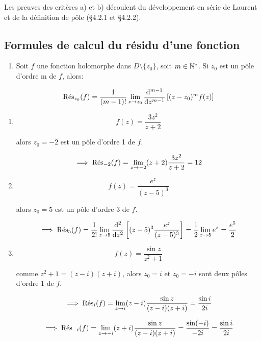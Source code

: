 \begin{remark}
    Les preuves des critères a) et b) découlent du développement en série de Laurent et de la définition de pôle (§4.2.1 et §4.2.2).
\end{remark}

\subsection{Formules de calcul du résidu d'une fonction}

\begin{method}\hfill
    
    \begin{enumerate}[label=\alph*)]
    \item 
    Soit $f$ une fonction holomorphe dans $D\setminus \{ z_0 \}$, soit $m \in \N^\ast$.
    Si $z_0$ est un pôle d'ordre m de $f$, alors:
    
    \[ \Res_{z_0}(f) = \frac{1}{(m - 1)!} \lim\limits_{z \rightarrow z_0} \frac{\dd^{m-1}}{\dz^{m - 1}} \left[ (z - z_0)^m f(z) \right] \]
    \end{enumerate}
\end{method}

\begin{example}\hfill
    
    \begin{enumerate}[label=\arabic{enumi})]
    \item 
    \[ f(z) = \frac{3z^2}{z + 2} \]
    
    alors $z_0 = -2$ est un pôle d'ordre 1 de $f$.
    
    \[ \implies \Res_{-2}(f) = \lim\limits_{z \rightarrow -2} (z + 2) \frac{3z^2}{z + 2} = 12 \]
    
    \item 
    \[ f(z) = \frac{e^z}{(z - 5)^3} \]
    
    alors $z_0 = 5$ est un pôle d'ordre 3 de $f$.
    
    \[ \implies \Res_{5}(f) = \frac{1}{2!} \lim\limits_{z \rightarrow 5} \frac{\dd^2}{\dz^2} \left[ (z - 5)^3 \frac{e^z}{(z - 5)^3}  \right] = \frac{1}{2} \lim\limits_{z \rightarrow 5} e^z = \frac{e^5}{2} \]
    
    \item 
    \[ f(z) = \frac{\sin z}{z^2 + 1} \]
    
    comme $z^2 + 1 = (z - i)(z + i)$, alors $z_0 = i$ et $z_0 = -i$ sont deux pôles d'ordre 1 de $f$.
    
    \[ \implies \Res_{i}(f) = \lim\limits_{z \rightarrow i} (z - i) \frac{\sin z}{(z - i)(z + i)} = \frac{\sin i}{2i} \]
    
    \[ \implies \Res_{-i}(f) = \lim\limits_{z \rightarrow -i} (z + i) \frac{\sin z}{(z - i)(z + i)} = \frac{\sin (-i)}{-2i} = \frac{\sin i}{2i} \]
    \end{enumerate}
    
\end{example}
